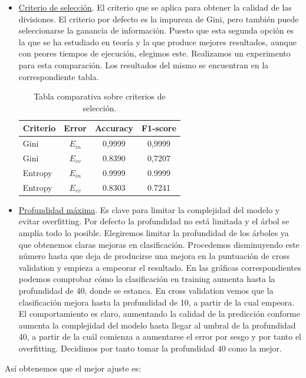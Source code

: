 \documentclass[11pt,a4paper]{article}
\begin{document}
\begin{itemize}
\item \underline{Criterio de selección}. El criterio que se aplica para obtener la calidad de las divisiones. El criterio por defecto es la impureza de Gini, pero también puede seleccionarse la ganancia de información. Puesto que esta segunda opción es la que se ha estudiado en teoría y la que produce mejores resultados, aunque con peores tiempos de ejecución, elegimos este. Realizamos un experimento para esta comparación. Los resultados del mismo se encuentran en la correspondiente tabla.

\begin{table}[h]
\begin{center}
\begin{tabular}{|l|c|c|c|}
\hline
  Criterio & Error & Accuracy & F1-score \\ \hline
  Gini & $E_{in}$ & 0,9999 & 0,9999 \\
  Gini & $E_{cv}$ & 0.8390 & 0,7207  \\
  Entropy & $E_{in}$ & 0.9999 & 0.9999 \\
  Entropy & $E_{cv}$ & 0.8303 & 0.7241 \\\hline
\end{tabular}
\caption{Tabla comparativa sobre criterios de selección.}
\end{center}
\end{table}

 
\item \underline{Profundidad máxima}. Es clave para limitar la complejidad del modelo y evitar overfitting. Por defecto la profundidad no está limitada y el árbol se amplía todo lo posible. Elegiremos limitar la profundidad de los árboles ya que obtenemos claras mejoras en clasificación. Procedemos disminuyendo este número hasta que deja de producirse una mejora en la puntuación de cross validation y empieza a empeorar el resultado. En las gráficas correspondientes podemos comprobar cómo la clasificación en training aumenta hasta la profundidad de 40, donde se estanca. En cross validation vemos que la clasificación mejora hasta la profundidad de 10, a partir de la cual empeora. El comportamiento es claro, aumentando la calidad de la predicción conforme aumenta la complejidad del modelo hasta llegar al umbral de la profundidad 40, a partir de la cuál comienza a aumentarse el error por sesgo y por tanto el overfitting. Decidimos por tanto tomar la profundidad 40 como la mejor.
\end{itemize}

Así obtenemos que el mejor ajuste es:
\end{document}
